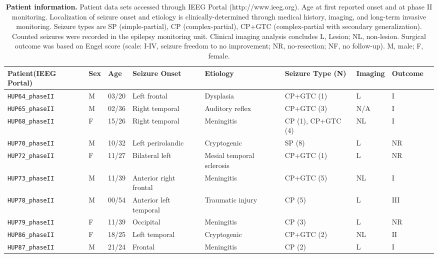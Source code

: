 \begin{table}[H]
    \scriptsize
    \centering
    \begin{tabular}{|x{2cm}|x{0.5cm}|x{0.75cm}|x{2cm}|x{1.5cm}|x{1.25cm}|x{1cm}|x{1cm}|x{1.40cm}|}
        \hline
        Patient\newline (IEEG Portal) & Sex & Age & Seizure Onset & Etiology & Seizure Type (N) & Imaging & Outcome \\ \hline \hline
        \verb|HUP64_phaseII| & M & 03/20 & Left frontal & Dysplasia & CP+GTC (1) & L & I\\ \hline
        \verb|HUP65_phaseII| & M & 02/36 & Right temporal & Auditory reflex & CP+GTC (3) & N/A & I\\ \hline
        \verb|HUP68_phaseII| & F & 15/26 & Right temporal & Meningitis & CP (1), CP+GTC (4) & NL & I\\ \hline
        \verb|HUP70_phaseII| & M & 10/32 & Left perirolandic & Cryptogenic & SP (8) & L & NR\\ \hline
        \verb|HUP72_phaseII| & F & 11/27 & Bilateral left & Mesial temporal sclerosis & CP+GTC (1) & L & NR\\ \hline
        \verb|HUP73_phaseII| & M & 11/39 & Anterior right frontal & Meningitis & CP+GTC (5) & NL & I\\ \hline
        \verb|HUP78_phaseII| & M & 00/54 & Anterior left temporal & Traumatic injury & CP (5) & L & III\\ \hline
        \verb|HUP79_phaseII| & F & 11/39 & Occipital & Meningitis & CP (3) & L & NR\\ \hline
        \verb|HUP86_phaseII| & F & 18/25 & Left temporal & Cryptogenic & CP+GTC (2) & NL & II\\ \hline
        \verb|HUP87_phaseII| & M & 21/24 & Frontal & Meningitis & CP (2) & L & I\\ \hline
    \end{tabular}
    \caption[Patient data set for Chapter \ref{ch:selfreg}]{\textbf{Patient information.} Patient data sets accessed through IEEG Portal (http://www.ieeg.org). Age at first reported onset and at phase II monitoring. Localization of seizure onset and etiology is clinically-determined through medical history, imaging, and long-term invasive monitoring. Seizure types are SP (simple-partial), CP (complex-partial), CP+GTC (complex-partial with secondary generalization). Counted seizures were recorded in the epilepsy monitoring unit. Clinical imaging analysis concludes L, Lesion; NL, non-lesion. Surgical outcome was based on Engel score (scale: I-IV, seizure freedom to no improvement; NR, no-resection; NF, no follow-up). M, male; F, female. \label{ch5:tab1}}
\end{table}

